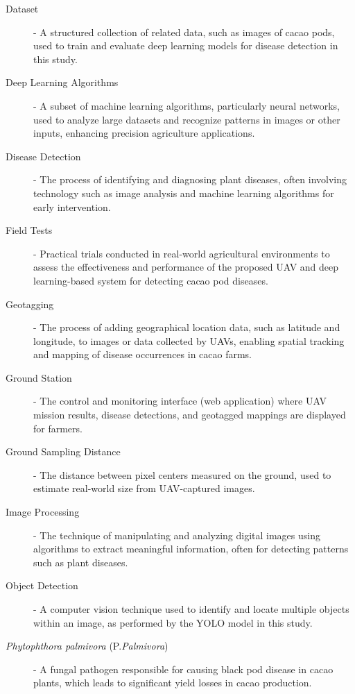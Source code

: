 {\begin{description}
	\item[Dataset] - A structured collection of related data, such as images of cacao pods, used to train and evaluate deep learning models for disease detection in this study.

	\item[Deep Learning Algorithms] - A subset of machine learning algorithms, particularly neural networks, used to analyze large datasets and recognize patterns in images or other inputs, enhancing precision agriculture applications.

	\item[Disease Detection] - The process of identifying and diagnosing plant diseases, often involving technology such as image analysis and machine learning algorithms for early intervention.

	\item[Field Tests] - Practical trials conducted in real-world agricultural environments to assess the effectiveness and performance of the proposed UAV and deep learning-based system for detecting cacao pod diseases.

	\item[Geotagging] - The process of adding geographical location data, such as latitude and longitude, to images or data collected by UAVs, enabling spatial tracking and mapping of disease occurrences in cacao farms.
	
	\item[Ground Station] - The control and monitoring interface (web application) where UAV mission results, disease detections, and geotagged mappings are displayed for farmers.
	
	\item[Ground Sampling Distance] - The distance between pixel centers measured on the ground, used to estimate real-world size from UAV-captured images.

	\item[Image Processing] - The technique of manipulating and analyzing digital images using algorithms to extract meaningful information, often for detecting patterns such as plant diseases.

	\item[Object Detection] - A computer vision technique used to identify and locate multiple objects within an image, as performed by the YOLO model in this study.
	
	\item[\textit{Phytophthora palmivora} (P.\textit{Palmivora})] - A fungal pathogen responsible for causing black pod disease in cacao plants, which leads to significant yield losses in cacao production.


\end{description}}
